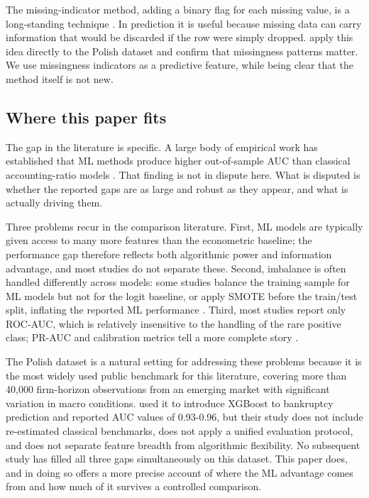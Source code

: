 \documentclass[12pt,a4paper]{article}
\begin{document}
The missing-indicator method, adding a binary flag for each missing value,
is a long-standing technique \citep{jones1996}. In prediction it is useful
because missing data can carry information that would be discarded if the
row were simply dropped. \cite{granularimputation2024} apply this idea
directly to the Polish dataset and confirm that missingness patterns matter.
We use missingness indicators as a predictive feature, while being clear
that the method itself is not new.

\subsection{Where this paper fits}

The gap in the literature is specific. A large body of empirical work has
established that ML methods produce higher out-of-sample AUC than classical
accounting-ratio models \citep{barboza2017, jones2017, dasilas2024}. That
finding is not in dispute here. What is disputed is whether the reported gaps
are as large and robust as they appear, and what is actually driving them.

Three problems recur in the comparison literature.
First, ML models are typically given access to many more features than the
econometric baseline; the performance gap therefore reflects both algorithmic
power and information advantage, and most studies do not separate these.
Second, imbalance is often handled differently across models: some studies
balance the training sample for ML models but not for the logit baseline,
or apply SMOTE before the train/test split, inflating the reported ML
performance \citep{king2001, chawla2002}. Third, most studies report only
ROC-AUC, which is relatively insensitive to the handling of the rare positive
class; PR-AUC and calibration metrics tell a more complete story
\citep{saito2015, hand2009}.

The Polish dataset is a natural setting for addressing these problems because
it is the most widely used public benchmark for this literature, covering more
than 40,000 firm-horizon observations from an emerging market with significant
variation in macro conditions. \cite{zieba2016} used it to introduce XGBoost
to bankruptcy prediction and reported AUC values of 0.93-0.96, but their
study does not include re-estimated classical benchmarks, does not apply a
unified evaluation protocol, and does not separate feature breadth from
algorithmic flexibility. No subsequent study has filled all three gaps
simultaneously on this dataset. This paper does, and in doing so offers a
more precise account of where the ML advantage comes from and how much of it
survives a controlled comparison.
\end{document}
